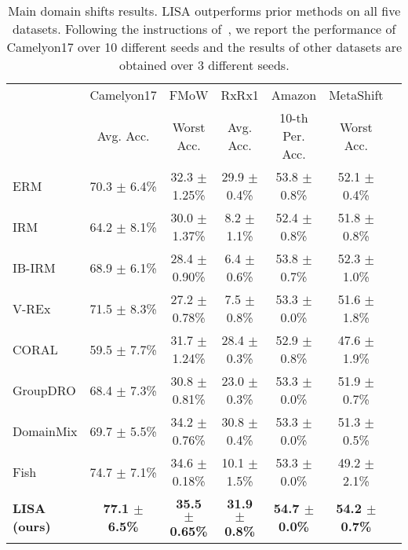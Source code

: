 \begin{table*}[h]
\small
\caption{Main domain shifts results. LISA outperforms prior methods on all five datasets. Following the instructions of~\citet{koh2021wilds}, we report the performance of Camelyon17 over 10 different seeds and the results of other datasets are obtained over 3 different seeds.}
\label{tab:res_domain}
\begin{center}
\begin{tabular}{l|cccccc}
\toprule
\multirow{2}{*}{}  & Camelyon17 & FMoW & RxRx1 & Amazon &  MetaShift\\\cmidrule{2-6}
& Avg. Acc. & Worst Acc. & Avg. Acc. & 10-th Per. Acc. & Worst Acc.\\\midrule
ERM & 70.3 $\pm$ 6.4\% & 32.3 $\pm$ 1.25\%  & 29.9 $\pm$ 0.4\% & 53.8 $\pm$ 0.8\% & 52.1 $\pm$ 0.4\% \\
IRM  & 64.2 $\pm$ 8.1\% & 30.0 $\pm$ 1.37\% & 8.2 $\pm$ 1.1\% &  52.4 $\pm$ 0.8\% & 51.8 $\pm$ 0.8\% \\
IB-IRM & 68.9 $\pm$ 6.1\% & 28.4 $\pm$ 0.90\% & 6.4 $\pm$ 0.6\% & 53.8 $\pm$ 0.7\% & 52.3 $\pm$ 1.0\% \\
V-REx & 71.5 $\pm$ 8.3\% & 27.2 $\pm$ 0.78\% & 7.5 $\pm$ 0.8\% & 53.3 $\pm$ 0.0\% & 51.6 $\pm$ 1.8\% \\
CORAL & 59.5 $\pm$ 7.7\% & 31.7 $\pm$ 1.24\% & 28.4 $\pm$ 0.3\% & 52.9 $\pm$ 0.8\% & 47.6 $\pm$ 1.9\%\\
GroupDRO & 68.4 $\pm$ 7.3\% & 30.8 $\pm$ 0.81\% & 23.0 $\pm$ 0.3\% & 53.3 $\pm$ 0.0\% & 51.9 $\pm$ 0.7\% \\
DomainMix & 69.7 $\pm$ 5.5\% & 34.2 $\pm$ 0.76\% & 30.8 $\pm$ 0.4\% & 53.3 $\pm$ 0.0\% & 51.3 $\pm$ 0.5\% \\
Fish & 74.7 $\pm$ 7.1\% & 34.6 $\pm$ 0.18\% & 10.1 $\pm$ 1.5\%  & 53.3 $\pm$ 0.0\% & 49.2 $\pm$ 2.1\% \\\midrule
\textbf{LISA (ours)} & \textbf{77.1 $\pm$ 6.5\%} & \textbf{35.5 $\pm$ 0.65\%} & \textbf{31.9 $\pm$ 0.8\%} & \textbf{54.7 $\pm$ 0.0\%} & \textbf{54.2 $\pm$ 0.7\%} \\
\bottomrule
\end{tabular}
\end{center}
\vspace{-2em}
\end{table*}

